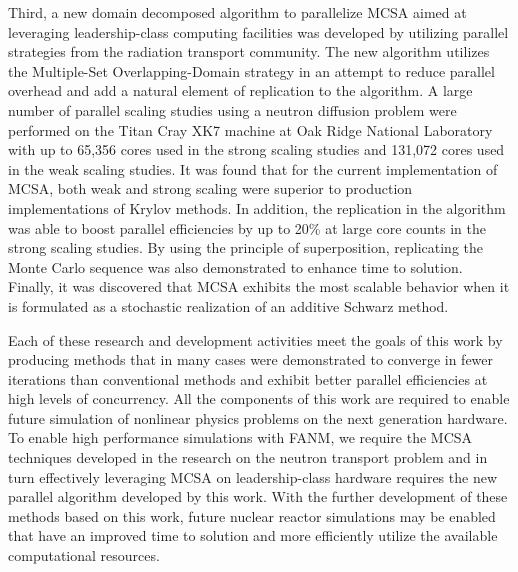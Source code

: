 Third, a new domain decomposed algorithm to parallelize MCSA aimed at
leveraging leadership-class computing facilities was developed by
utilizing parallel strategies from the radiation transport
community. The new algorithm utilizes the Multiple-Set
Overlapping-Domain strategy in an attempt to reduce parallel overhead
and add a natural element of replication to the algorithm. A large
number of parallel scaling studies using a neutron diffusion problem
were performed on the Titan Cray XK7 machine at Oak Ridge National
Laboratory with up to 65,356 cores used in the strong scaling studies
and 131,072 cores used in the weak scaling studies. It was found that
for the current implementation of MCSA, both weak and strong scaling
were superior to production implementations of Krylov methods. In
addition, the replication in the algorithm was able to boost parallel
efficiencies by up to 20\% at large core counts in the strong scaling
studies. By using the principle of superposition, replicating the
Monte Carlo sequence was also demonstrated to enhance time to
solution. Finally, it was discovered that MCSA exhibits the most
scalable behavior when it is formulated as a stochastic realization of
an additive Schwarz method.

Each of these research and development activities meet the goals of
this work by producing methods that in many cases were demonstrated to
converge in fewer iterations than conventional methods and exhibit
better parallel efficiencies at high levels of concurrency. All the
components of this work are required to enable future simulation of
nonlinear physics problems on the next generation hardware. To enable
high performance simulations with FANM, we require the MCSA techniques
developed in the research on the neutron transport problem and in turn
effectively leveraging MCSA on leadership-class hardware requires the
new parallel algorithm developed by this work. With the further
development of these methods based on this work, future nuclear
reactor simulations may be enabled that have an improved time to
solution and more efficiently utilize the available computational
resources.
